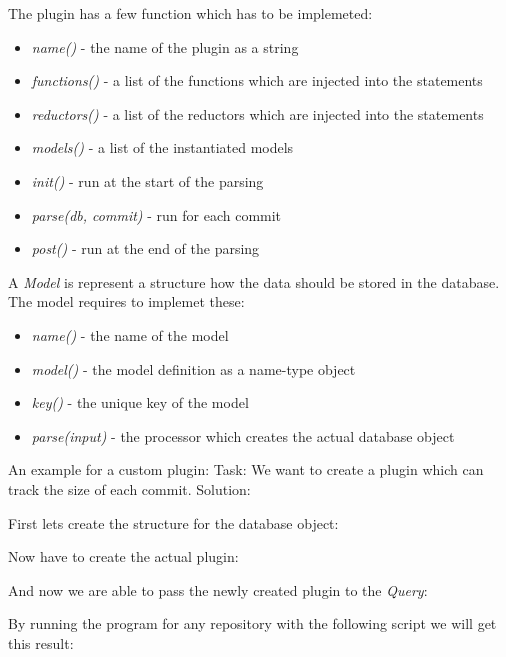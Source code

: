 The plugin has a few function which has to be implemeted:
\begin{itemize}
	\item \textit{name()} - the name of the plugin as a string
	\item \textit{functions()} - a list of the functions which are injected into the statements
	\item \textit{reductors()} - a list of the reductors which are injected into the statements
	\item \textit{models()} - a list of the instantiated models
 
	\item \textit{init()} - run at the start of the parsing
	\item \textit{parse(db, commit)} - run for each commit
	\item \textit{post()} - run at the end of the parsing
\end{itemize}

A \textit{Model} is represent a structure how the data should be stored in the database.
The model requires to implemet these:
\begin{itemize}
	\item \textit{name()} - the name of the model
	\item \textit{model()} - the model definition as a name-type object 
	\item \textit{key()} - the unique key of the model
	\item \textit{parse(input)} - the processor which creates the actual database object
\end{itemize}

An example for a custom plugin:\newline
Task: We want to create a plugin which can track the size of each commit. 
Solution:\newline

First lets create the structure for the database object:


Now have to create the actual plugin:


And now we are able to pass the newly created plugin to the \textit{Query}:


By running the program for any repository with the following script we will get this result:




